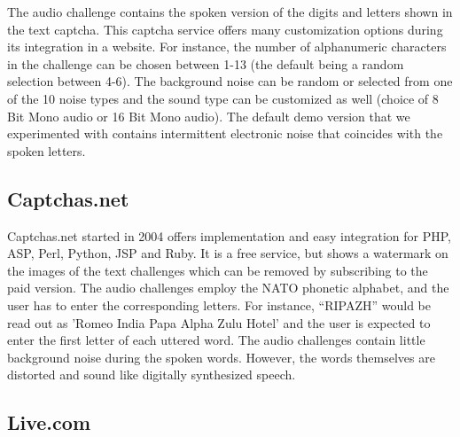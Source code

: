 The audio challenge contains the spoken version of the digits and letters shown in the text captcha.
This captcha service offers many customization options during its integration in a website. For instance, 
the number of alphanumeric characters in the challenge can be chosen between
1-13 (the default being a random selection between 4-6). The background noise can be random or selected from one of 
the 10 noise types and the sound type can be customized as well (choice of 8 Bit Mono audio or 16 Bit 
Mono audio). The default demo version that we experimented with contains intermittent electronic noise that 
coincides with the spoken letters.

\subsection{Captchas.net}

Captchas.net started in 2004 offers implementation and easy integration for PHP, ASP, Perl, 
Python, JSP and Ruby. It is a free service, but shows a watermark on the images of the text challenges 
which can be removed by subscribing to the paid version. 
The audio challenges employ the NATO phonetic alphabet, and the user has to enter the corresponding letters.
For instance, ``RIPAZH'' would be read out as 'Romeo India Papa Alpha Zulu Hotel' and the user is expected 
to enter the first letter of each uttered word. The audio challenges contain little background noise during the 
spoken words. However, the words themselves are distorted and sound like digitally synthesized speech.

%


\subsection{Live.com}

